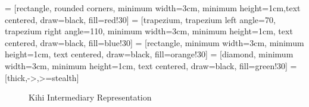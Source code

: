  = [rectangle, rounded corners, minimum width=3cm, minimum height=1cm,text centered, draw=black, fill=red!30]
 = [trapezium, trapezium left angle=70, trapezium right angle=110, minimum width=3cm, minimum height=1cm, text centered, draw=black, fill=blue!30]
 = [rectangle, minimum width=3cm, minimum height=1cm, text centered, draw=black, fill=orange!30]
 = [diamond, minimum width=3cm, minimum height=1cm, text centered, draw=black, fill=green!30]
 = [thick,->,>=stealth]

\begin{figure}[htb]
    \centering
    \caption{Kihi Intermediary Representation}
    \label{fig:kihi_intermediary_representation}
\end{figure}